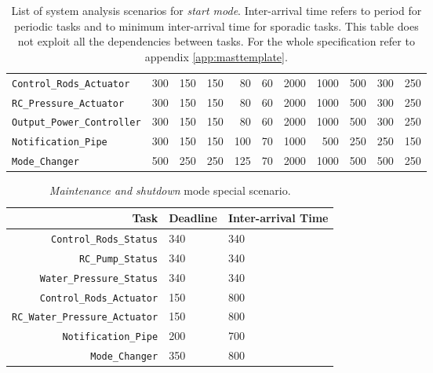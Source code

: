 \documentclass[10pt,a4paper]{report}
\begin{document}
\begin{table}[hbt]
{\begin{tabular}{|l | *{5}{|r|} *{5}{|r|}}
\texttt{Control\_Rods\_Actuator}   & 300  & 150  & 150 & 80  & 60
                                   & 2000 & 1000 & 500 & 300 & 250\\
\texttt{RC\_Pressure\_Actuator}    & 300  & 150  & 150 & 80  & 60
                                   & 2000 & 1000 & 500 & 300 & 250\\
\texttt{Output\_Power\_Controller} & 300  & 150  & 150 & 80  & 60
                                   & 2000 & 1000 & 500 & 300 & 250\\
\texttt{Notification\_Pipe}        & 300  & 150  & 150 & 100 & 70
                                   & 1000 & 500  & 250 & 250 & 150\\
\texttt{Mode\_Changer}             & 500  & 250  & 250 & 125 & 70 
                                   & 2000 & 1000 & 500 & 500 & 250\\
\hline
\end{tabular}
}
\caption{
    List of system analysis scenarios for \emph{start mode}. Inter-arrival time 
    refers to period for periodic tasks and to minimum inter-arrival time for 
    sporadic tasks. This table does not exploit all the dependencies between 
    tasks. For the whole specification refer to appendix \ref{app:masttemplate}.
}
\label{tbl:scenariodef}
\end{table}


\begin{table}[htb]
\begin{tabular}{|r |l l|}
\hline
\textbf{Task} & \textbf{Deadline} & \textbf{Inter-arrival Time} \\
\hline
\texttt{Control\_Rods\_Status}   & 340 & 340\\
\texttt{RC\_Pump\_Status}        & 340 & 340\\
\texttt{Water\_Pressure\_Status} & 340 & 340\\

\texttt{Control\_Rods\_Actuator}       & 150 & 800 \\
\texttt{RC\_Water\_Pressure\_Actuator} & 150 & 800 \\
\texttt{Notification\_Pipe}            & 200 & 700 \\
\texttt{Mode\_Changer}                 & 350 & 800 \\
\hline
\end{tabular}
\caption{\emph{Maintenance and shutdown} mode special scenario.}
\label{tbl:scenariomm}
\end{table}

\newpage
\end{document}
